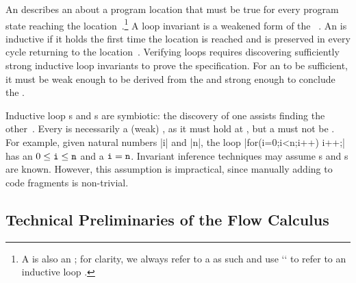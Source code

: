 An \emph{} describes an  about a program location
that must be true for every program state reaching the
location~\cite{furia2010,nguyen2022}.\footnote{A  is also an
; for clarity, we always refer to a  as such
and use `` to refer to an inductive
loop .} A {loop invariant} is a weakened form of the ~\cite{furia2010}. An
 is {inductive} if it holds the first time the location is
reached and is preserved in every cycle returning to the
location~\cite{sankaranarayanan2004}. Verifying loops requires discovering
{sufficiently strong} inductive loop invariants to prove
the specification. For an  to be sufficient, it must be weak
enough to be derived from the  and strong enough to conclude
the .

Inductive loop s
and s are symbiotic: the discovery of one assists finding the
other~\cite{furia2010}. Every  is necessarily a (weak)
, as it must hold at , but a
 must not be . For example, given natural
numbers \pr|i| and \pr|n|, the loop \prc|for(i=0;i<n;i++) i++;| has an
 \(0 \leq \prm{i} \leq \prm{n}\) and a 
\(\prm{i}=\prm{n}\). Invariant inference techniques may assume
s and s are known. However, this assumption
is impractical, since manually adding  to code fragments is
non-trivial.

\subsection{Technical Preliminaries of the Flow Calculus}
\label{sec:calc}

